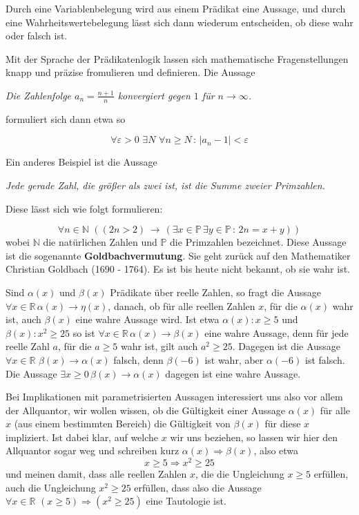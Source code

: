 Durch eine Variablenbelegung wird aus einem Prädikat eine Aussage, und durch eine Wahrheitswertebelegung 
lässt sich dann wiederum entscheiden, ob diese wahr oder falsch ist. 

\bigbreak

Mit der Sprache der Prädikatenlogik lassen sich mathematische Fragenstellungen knapp und präzise fromulieren 
und definieren. Die Aussage

\centerline{ \textit{Die Zahlenfolge $a_n = \frac {n+1}{n}$ konvergiert gegen $1$ für $n \rightarrow \infty$.}}

formuliert sich dann etwa so

  	$$ \forall \varepsilon > 0 \,\, \exists N  \,\, \forall n \geq N \, : \,  \vert a_n - 1 \vert < \varepsilon $$


\bigbreak

Ein anderes Beispiel ist die Aussage
 
\centerline{\textit{Jede gerade Zahl, die größer als zwei ist, ist die Summe zweier Primzahlen.}}

Diese lässt sich wie folgt formulieren:

  	$$ \forall n \in \mathbb N \, \, \left( ( 2n > 2 ) \, \rightarrow \, (\exists x \in \mathbb P \, \exists y \in 
    	\mathbb P \, : \, 2n = x + y) \right) $$
wobei $\mathbb N$ die natürlichen Zahlen und $\mathbb P$ die Primzahlen bezeichnet. 
Diese Aussage ist die sogenannte \textbf{Goldbachvermutung}. Sie geht zurück auf den Mathematiker Christian 
Goldbach (1690 - 1764). Es ist bis heute nicht bekannt, ob sie wahr ist.

\bigbreak

\begin{beispiel} Sind $\alpha(x)$ und $\beta(x)$ Prädikate über reelle Zahlen, so fragt die Aussage $\forall x 
\in \mathbb R \, \alpha(x) \rightarrow \eta(x)$, danach, ob für alle reellen Zahlen $x$, für die $\alpha(x)$ wahr ist, auch 
$\beta(x)$ eine wahre Aussage wird. Ist etwa $\alpha(x): x \geq 5$ und $\beta(x): x^2 \geq 25$ so ist $\forall x 
\in \mathbb R \, \alpha(x) \rightarrow \beta(x)$ eine wahre Aussage, denn für jede reelle Zahl $a$, für die 
$a \geq 5$ wahr ist, gilt auch $a^2 \geq 25$. Dagegen ist die Aussage $\forall x 
\in \mathbb R \,\, \beta(x) \rightarrow \alpha(x)$ falsch, denn $\beta(-6)$ ist wahr, aber $\alpha(-6)$ ist falsch. 
Die Aussage $\exists x \geq 0 \, \beta(x) \rightarrow \alpha(x)$ dagegen ist eine wahre Aussage. 

Bei Implikationen mit parametrisierten Aussagen interessiert uns also vor allem der Allquantor, wir wollen wissen, ob die 
Gültigkeit einer Aussage $\alpha(x)$ für alle $x$ (aus einem bestimmten Bereich) die Gültigkeit von $\beta(x)$ für diese 
$x$ impliziert. Ist dabei klar, auf welche $x$ wir uns beziehen, so lassen wir hier den Allquantor sogar weg und 
schreiben kurz $\alpha(x) \Rightarrow \beta(x)$, also etwa 
  	$$ x \geq 5 \Rightarrow x^2 \geq 25 $$
und meinen damit, dass alle reellen Zahlen $x$, die die Ungleichung $x \geq 5$ erfüllen, auch die 
Ungleichung $x^2 \geq 25$ erfüllen, dass also die Aussage $\forall x \in \mathbb R \, \, 
(x \geq 5) \Rightarrow (x^2 \geq 25) $ eine Tautologie ist.
\end{beispiel}

